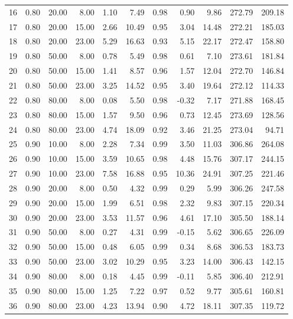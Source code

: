\documentclass[useAMS, usenatbib, referee]{biom}\usepackage[]{graphicx}\usepackage[]{color}
\begin{document}
\begin{table}[ht]
{\begin{tabular}{rrrrrrrrrrr}
  16 & 0.80 & 20.00 & 8.00 & 1.10 & 7.49 & 0.98 & 0.90 & 9.86 & 272.79 & 209.18 \\ 
  17 & 0.80 & 20.00 & 15.00 & 2.66 & 10.49 & 0.95 & 3.04 & 14.48 & 272.21 & 185.03 \\ 
  18 & 0.80 & 20.00 & 23.00 & 5.29 & 16.63 & 0.93 & 5.15 & 22.17 & 272.47 & 158.80 \\ 
  19 & 0.80 & 50.00 & 8.00 & 0.78 & 5.49 & 0.98 & 0.61 & 7.10 & 273.61 & 181.84 \\ 
  20 & 0.80 & 50.00 & 15.00 & 1.41 & 8.57 & 0.96 & 1.57 & 12.04 & 272.70 & 146.84 \\ 
  21 & 0.80 & 50.00 & 23.00 & 3.25 & 14.52 & 0.95 & 3.40 & 19.64 & 272.12 & 114.33 \\ 
  22 & 0.80 & 80.00 & 8.00 & 0.08 & 5.50 & 0.98 & -0.32 & 7.17 & 271.88 & 168.45 \\ 
  23 & 0.80 & 80.00 & 15.00 & 1.57 & 9.50 & 0.96 & 0.73 & 12.45 & 273.69 & 128.56 \\ 
  24 & 0.80 & 80.00 & 23.00 & 4.74 & 18.09 & 0.92 & 3.46 & 21.25 & 273.04 & 94.71 \\ 
  25 & 0.90 & 10.00 & 8.00 & 2.28 & 7.34 & 0.99 & 3.50 & 11.03 & 306.86 & 264.08 \\ 
  26 & 0.90 & 10.00 & 15.00 & 3.59 & 10.65 & 0.98 & 4.48 & 15.76 & 307.17 & 244.15 \\ 
  27 & 0.90 & 10.00 & 23.00 & 7.58 & 16.88 & 0.95 & 10.36 & 24.91 & 307.25 & 221.46 \\ 
  28 & 0.90 & 20.00 & 8.00 & 0.50 & 4.32 & 0.99 & 0.29 & 5.99 & 306.26 & 247.58 \\ 
  29 & 0.90 & 20.00 & 15.00 & 1.99 & 6.51 & 0.98 & 2.32 & 9.83 & 307.15 & 220.34 \\ 
  30 & 0.90 & 20.00 & 23.00 & 3.53 & 11.57 & 0.96 & 4.61 & 17.10 & 305.50 & 188.14 \\ 
  31 & 0.90 & 50.00 & 8.00 & 0.27 & 4.31 & 0.99 & -0.15 & 5.62 & 306.65 & 226.09 \\ 
  32 & 0.90 & 50.00 & 15.00 & 0.48 & 6.05 & 0.99 & 0.34 & 8.68 & 306.53 & 183.73 \\ 
  33 & 0.90 & 50.00 & 23.00 & 3.02 & 10.29 & 0.95 & 3.23 & 14.00 & 306.43 & 142.15 \\ 
  34 & 0.90 & 80.00 & 8.00 & 0.18 & 4.45 & 0.99 & -0.11 & 5.85 & 306.40 & 212.91 \\ 
  35 & 0.90 & 80.00 & 15.00 & 1.25 & 7.22 & 0.97 & 0.52 & 9.77 & 305.61 & 160.81 \\ 
  36 & 0.90 & 80.00 & 23.00 & 4.23 & 13.94 & 0.90 & 4.72 & 18.11 & 307.35 & 119.72 \\ 
   \hline
\end{tabular}
}
\endgroup
\end{table}
\end{document}
